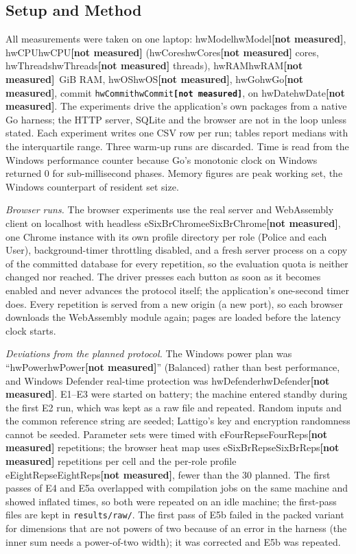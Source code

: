 \documentclass[conference,letterpaper]{IEEEtran}
\newcommand{\num}[1]{\ifcsname #1\endcsname\csname #1\endcsname\else\textbf{[not measured]}\fi}
\begin{document}
\subsection{Setup and Method}
All measurements were taken on one laptop: \num{hwModel}, \num{hwCPU} (\num{hwCores} cores, \num{hwThreads} threads), \num{hwRAM}~GiB RAM, \num{hwOS}, \num{hwGo}, commit \texttt{\num{hwCommit}}, on \num{hwDate}. The experiments drive the application's own packages from a native Go harness; the HTTP server, SQLite and the browser are not in the loop unless stated. Each experiment writes one CSV row per run; tables report medians with the interquartile range. Three warm-up runs are discarded. Time is read from the Windows performance counter because Go's monotonic clock on Windows returned 0 for sub-millisecond phases. Memory figures are peak working set, the Windows counterpart of resident set size.

\emph{Browser runs.} The browser experiments use the real server and WebAssembly client on localhost with headless \num{eSixBrChrome}, one Chrome instance with its own profile directory per role (Police and each User), background-timer throttling disabled, and a fresh server process on a copy of the committed database for every repetition, so the evaluation quota is neither changed nor reached. The driver presses each button as soon as it becomes enabled and never advances the protocol itself; the application's one-second timer does. Every repetition is served from a new origin (a new port), so each browser downloads the WebAssembly module again; pages are loaded before the latency clock starts.

\emph{Deviations from the planned protocol.} The Windows power plan was ``\num{hwPower}'' (Balanced) rather than best performance, and Windows Defender real-time protection was \num{hwDefender}. E1--E3 were started on battery; the machine entered standby during the first E2 run, which was kept as a raw file and repeated. Random inputs and the common reference string are seeded; Lattigo's key and encryption randomness cannot be seeded. Parameter sets were timed with \num{eFourReps} repetitions; the browser heat map uses \num{eSixBrReps} repetitions per cell and the per-role profile \num{eEightReps}, fewer than the 30 planned. The first passes of E4 and E5a overlapped with compilation jobs on the same machine and showed inflated times, so both were repeated on an idle machine; the first-pass files are kept in \texttt{results/raw/}. The first pass of E5b failed in the packed variant for dimensions that are not powers of two because of an error in the harness (the inner sum needs a power-of-two width); it was corrected and E5b was repeated.
\end{document}
